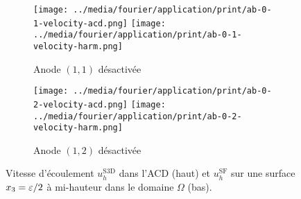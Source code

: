 \begin{figure}[h]
  \begin{center}
    \begin{subfigure}[t]{\textwidth}
      \begin{center}
        \texttt{[image: ../media/fourier/application/print/ab-0-1-velocity-acd.png]}
        \texttt{[image: ../media/fourier/application/print/ab-0-1-velocity-harm.png]}
        \caption{Anode $(1,1)$ désactivée}
        \label{fig:}
      \end{center}
    \end{subfigure}

    \begin{subfigure}[t]{\textwidth}
      \begin{center}
        \texttt{[image: ../media/fourier/application/print/ab-0-2-velocity-acd.png]}
        \texttt{[image: ../media/fourier/application/print/ab-0-2-velocity-harm.png]}
        \caption{Anode $(1,2)$ désactivée}
        \label{fig:}
      \end{center}
    \end{subfigure}


    \caption{Vitesse d'écoulement $u_h^\mathrm{S3D}$ dans l'ACD (haut)
      et $u_h^\mathrm{SF}$ sur une surface $x_3 = \varepsilon / 2$ à
      mi-hauteur dans le domaine $\Omega$ (bas).}

    \label{fig:harmonic-velocity-comp-a}
  \end{center}
\end{figure}


